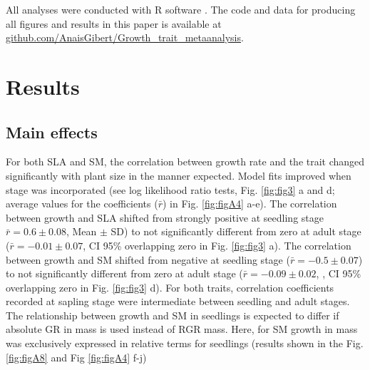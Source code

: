 \documentclass[a4paper,11pt]{article}
\newcommand{\smurl}[1]{\url{#1}}
\begin{document}
All analyses were conducted with R software \citep{Ralanguageanden:2014wf}. The code and data for producing all figures and results in this paper is available at \smurl{github.com/AnaisGibert/Growth\_trait\_metaanalysis}.

\section*{Results}\label{results}

\subsection*{Main effects}

For both SLA and SM, the correlation between growth rate and the trait changed significantly with plant size in the manner expected. Model fits improved when stage was incorporated (see log likelihood ratio tests, Fig. \ref{fig:fig3} a and d; average values for the coefficients ($\bar{r}$) in Fig. \ref{fig:figA4} a-e). The correlation between growth and SLA shifted from strongly positive at seedling stage $\bar{r}=0.6 \pm 0.08$, Mean $\pm$ SD) to not significantly different from zero at adult stage ($\bar{r}= -0.01 \pm 0.07$, CI 95\% overlapping zero in Fig. \ref{fig:fig3} a). The correlation between growth and SM shifted from negative at seedling stage ($\bar{r}= -0.5 \pm 0.07$) to not significantly different from zero at adult stage ($\bar{r}= -0.09 \pm 0.02$, , CI 95\% overlapping zero in Fig. \ref{fig:fig3} d). For both traits, correlation coefficients recorded at sapling stage were intermediate between seedling and adult stages. The relationship between growth and SM in seedlings is expected to differ if absolute GR in mass is used instead of RGR mass. Here, for SM growth in mass was exclusively expressed in relative terms for seedlings (results shown in the Fig. \ref{fig:figA8} and Fig \ref{fig:figA4} f-j) 
\end{document}
